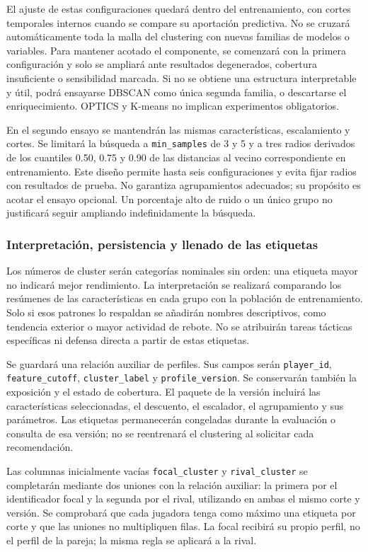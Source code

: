 El ajuste de estas configuraciones quedará dentro del entrenamiento, con cortes temporales internos cuando se compare su aportación predictiva. No se cruzará automáticamente toda la malla del clustering con nuevas familias de modelos o variables. Para mantener acotado el componente, se comenzará con la primera configuración y solo se ampliará ante resultados degenerados, cobertura insuficiente o sensibilidad marcada. Si no se obtiene una estructura interpretable y útil, podrá ensayarse DBSCAN como única segunda familia, o descartarse el enriquecimiento. OPTICS y K-means no implican experimentos obligatorios.

En el segundo ensayo se mantendrán las mismas características, escalamiento y cortes. Se limitará la búsqueda a \texttt{min\_\allowbreak samples} de 3 y 5 y a tres radios derivados de los cuantiles 0.50, 0.75 y 0.90 de las distancias al vecino correspondiente en entrenamiento. Este diseño permite hasta seis configuraciones y evita fijar radios con resultados de prueba. No garantiza agrupamientos adecuados; su propósito es acotar el ensayo opcional. Un porcentaje alto de ruido o un único grupo no justificará seguir ampliando indefinidamente la búsqueda.

\subsubsection*{Interpretación, persistencia y llenado de las etiquetas}
Los números de cluster serán categorías nominales sin orden: una etiqueta mayor no indicará mejor rendimiento. La interpretación se realizará comparando los resúmenes de las características en cada grupo con la población de entrenamiento. Solo si esos patrones lo respaldan se añadirán nombres descriptivos, como tendencia exterior o mayor actividad de rebote. No se atribuirán tareas tácticas específicas ni defensa directa a partir de estas etiquetas.

Se guardará una relación auxiliar de perfiles. Sus campos serán \texttt{player\_\allowbreak id}, \texttt{feature\_\allowbreak cutoff}, \texttt{cluster\_\allowbreak label} y \texttt{profile\_\allowbreak version}. Se conservarán también la exposición y el estado de cobertura. El paquete de la versión incluirá las características seleccionadas, el descuento, el escalador, el agrupamiento y sus parámetros. Las etiquetas permanecerán congeladas durante la evaluación o consulta de esa versión; no se reentrenará el clustering al solicitar cada recomendación.

Las columnas inicialmente vacías \texttt{focal\_\allowbreak cluster} y \texttt{rival\_\allowbreak cluster} se completarán mediante dos uniones con la relación auxiliar: la primera por el identificador focal y la segunda por el rival, utilizando en ambas el mismo corte y versión. Se comprobará que cada jugadora tenga como máximo una etiqueta por corte y que las uniones no multipliquen filas. La focal recibirá su propio perfil, no el perfil de la pareja; la misma regla se aplicará a la rival.

